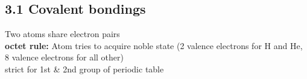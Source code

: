 \subsection{3.1 Covalent bondings}
    Two atoms share electron pairs\\
    \textbf{octet rule:} Atom tries to acquire noble state (2 valence electrons for H and He, 8 valence electrons for all other)\\
        strict for 1st \& 2nd group of periodic table 
    